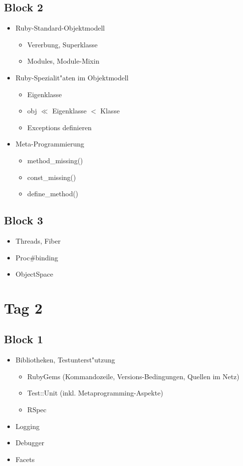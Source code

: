 \documentclass[a4paper,10pt]{article}
\begin{document}
\subsection*{Block 2}

\begin{itemize}
  \item Ruby-Standard-Objektmodell
  \begin{itemize}
    \item Vererbung, Superklasse
    \item Modules, Module-Mixin
  \end{itemize}
  \item Ruby-Spezialit"aten im Objektmodell
  \begin{itemize}
    \item Eigenklasse
    \item obj $\ll$ Eigenklasse $<$ Klasse
    \item Exceptions definieren
  \end{itemize}
  \item Meta-Programmierung
  \begin{itemize}
    \item method\_missing()
    \item const\_missing()
    \item define\_method()
  \end{itemize}
\end{itemize}

\subsection*{Block 3}

\begin{itemize}
  \item Threads, Fiber
  \item Proc\#binding
  \item ObjectSpace
\end{itemize}

\section*{Tag 2}

\subsection*{Block 1}

\begin{itemize}
  \item Bibliotheken, Testunterst"utzung
  \begin{itemize}
    \item RubyGems (Kommandozeile, Versions-Bedingungen, Quellen im Netz)
    \item Test::Unit (inkl. Metaprogramming-Aspekte)
    \item RSpec
  \end{itemize}
  \item Logging
  \item Debugger
  \item Facets
\end{itemize}
\end{document}
